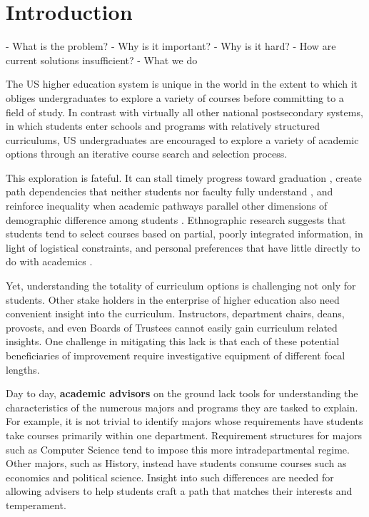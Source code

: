 \section{Introduction}

- What is the problem?
- Why is it important?
- Why is it hard?
- How are current solutions insufficient?
- What we do

The US higher education system is unique in the world in the extent to
which it obliges undergraduates to explore a variety of courses before
committing to a field of study. In contrast with virtually all other
national postsecondary systems, in which students enter schools and
programs with relatively structured curriculums, US undergraduates are
encouraged to explore a variety of academic options through an
iterative course search and selection process.


This exploration is fateful. It can stall timely progress toward
graduation \cite{bailey2015redesigning}, create path dependencies that
neither students nor faculty fully understand
\cite{chambliss2014college}, and reinforce inequality when academic
pathways parallel other dimensions of demographic difference among
students \cite{armstrong2013paying}. Ethnographic research suggests
that students tend to select courses based on partial, poorly
integrated information, in light of logistical constraints, and
personal preferences that have little directly to do with academics
\cite{nathan2006my,rosenbaum2011complexities, rosenbaum2007after}.

Yet, understanding the totality of curriculum options is challenging
not only for students. Other stake holders in the enterprise of higher
education also need convenient insight into the
curriculum. Instructors, department chairs, deans, provosts, and
even Boards of Trustees cannot easily gain curriculum related
insights. One challenge in mitigating this lack is that each of these
potential beneficiaries of improvement require investigative equipment
of different focal lengths. 

Day to day, {\bf academic advisors} on the ground lack tools for
understanding the characteristics of the numerous majors and programs
they are tasked to explain. For example, it is not trivial to identify
majors whose requirements have students take courses primarily within
one department. Requirement structures for majors such as Computer
Science tend to impose this more intradepartmental regime. Other
majors, such as History, instead have students consume courses such as
economics and political science. Insight into such differences are
needed for allowing advisers to help students craft a path that
matches their interests and temperament.

